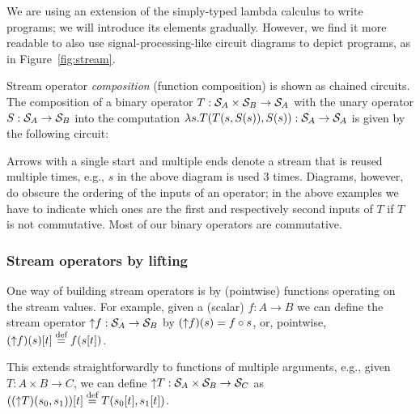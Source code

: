 We are using an extension of the simply-typed lambda calculus to write \dbsp programs;
we will introduce its elements gradually.  However, we find it more readable to
also use signal-processing-like circuit diagrams to depict \dbsp programs,
as in Figure~\ref{fig:stream}.

Stream operator \emph{composition} (function composition) is shown as chained circuits.
The composition of a binary operator $T: \mathcal{S}_{A} \times \mathcal{S}_{B} \to \mathcal{S}_{A}$ with the 
unary operator $S: \mathcal{S}_{A} \to \mathcal{S}_{B}$ into the computation 
$\lambda s. T(T(s,S(s)),S(s)) : \mathcal{S}_{A}\to\mathcal{S}_{A}$ 
is given by the following circuit:

\begin{center}
\end{center}

Arrows with a single start and multiple 
ends denote a stream that is reused multiple times, e.g., $s$
in the above diagram is used 3 times.  Diagrams, however, do obscure the
ordering of the inputs of an operator; in the above examples
we have to indicate which ones are the first and respectively second inputs of $T$
if $T$ is not commutative.  Most of our binary operators are commutative.

\subsubsection{Stream operators by lifting}\label{sec:lifting}

One way of building stream operators is by (pointwise)  
functions operating on the stream values. For example, given a (scalar)
$f: A \to B$ we can define the stream operator
${\uparrow}f :\mathcal{S}_{A} \to \mathcal{S}_{B}$ by $({\uparrow}f)(s)=f \circ s$,
or, pointwise, $({\uparrow}f)(s)[t] \stackrel{\textrm{\scriptsize def}}{=} f(s[t])$.

This extends straightforwardly to functions of multiple arguments, e.g.,
given $T: A \times B \rightarrow C$, we can define ${\uparrow}T: \mathcal{S}_{A} \times \mathcal{S}_{B}
\rightarrow \mathcal{S}_{C}$ as $(({\uparrow}T)(s_0, s_1))[t] \stackrel{\textrm{\scriptsize def}}{=} T(s_0[t], s_1[t])$.

